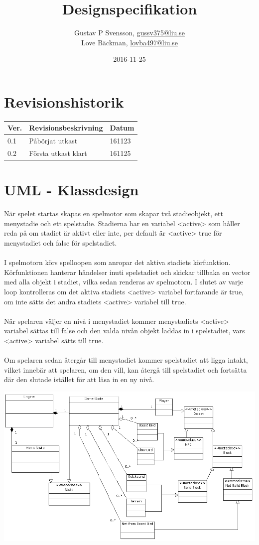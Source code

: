 \documentclass{TDP005-mall}
\author{Gustav P Svensson, \url{gussv375@liu.se}\\
  Love Bäckman, \url{lovba497@liu.se}}
\title{Designspecifikation}
\date{2016-11-25}
\begin{document}
\projectpage
\section{Revisionshistorik}
\begin{table}[!h]
\begin{tabularx}{\linewidth}{|l|X|l|}
\hline
Ver. & Revisionsbeskrivning & Datum \\\hline
0.1 & Påbörjat utkast & 161123 \\\hline
0.2 & Första utkast klart & 161125 \\\hline
\end{tabularx}
\end{table}


\section{UML - Klassdesign}
När spelet startas skapas en spelmotor som skapar två stadieobjekt, ett menystadie och ett spelstadie. Stadierna har en variabel <active> som håller reda på om stadiet är aktivt eller inte, per default är <active> true för menystadiet och false för spelstadiet.
\\\\
I spelmotorn körs spelloopen som anropar det aktiva stadiets körfunktion. Körfunktionen  hanterar händelser inuti spelstadiet och skickar tillbaka en vector med alla objekt i stadiet, vilka sedan renderas av spelmotorn. I slutet av varje loop kontrolleras om det aktiva stadiets <active> variabel fortfarande är true, om inte sätts det andra stadiets <active> variabel till true.
\\\\
När spelaren väljer en nivå i menystadiet kommer menystadiets <active> variabel sättas till false och den valda nivån objekt laddas in i spelstadiet, vars <active> variabel sätts till true.
\\\\
Om spelaren sedan återgår till menystadiet kommer spelstadiet att ligga intakt, vilket innebär att spelaren, om den vill, kan återgå till spelstadiet och fortsätta där den slutade istället för att läsa in en ny nivå.

\includegraphics[scale=0.5]{ClassDiagram}
\end{document}
